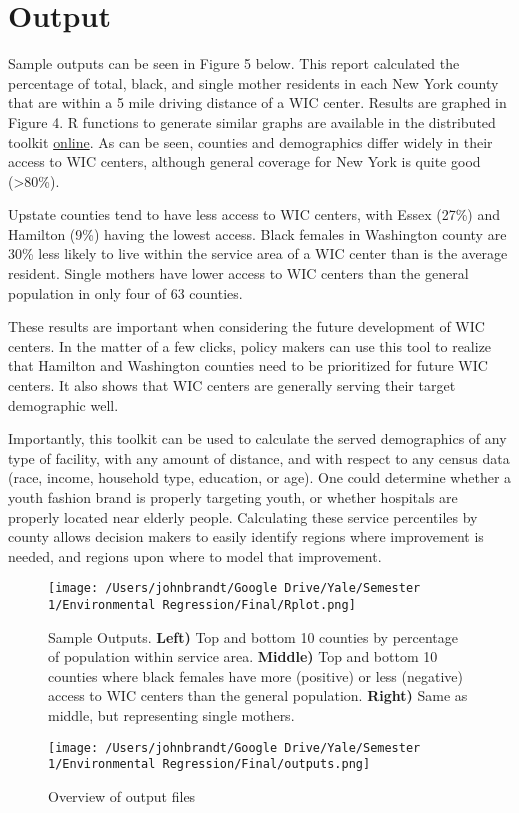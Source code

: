 \documentclass[11pt,]{article}
\begin{document}
\section{Output}\label{output}

\noindent Sample outputs can be seen in Figure 5 below. This report
calculated the percentage of total, black, and single mother residents
in each New York county that are within a 5 mile driving distance of a
WIC center. Results are graphed in Figure 4. R functions to generate
similar graphs are available in the distributed toolkit
\href{https://www.github.com/johnmbrandt/public-resource-mapper/}{online}.
As can be seen, counties and demographics differ widely in their access
to WIC centers, although general coverage for New York is quite good
(\textgreater{}80\%).\vspace{3mm}

\noindent Upstate counties tend to have less access to WIC centers, with
Essex (27\%) and Hamilton (9\%) having the lowest access. Black females
in Washington county are 30\% less likely to live within the service
area of a WIC center than is the average resident. Single mothers have
lower access to WIC centers than the general population in only four of
63 counties. \vspace{3mm}

\noindent These results are important when considering the future
development of WIC centers. In the matter of a few clicks, policy makers
can use this tool to realize that Hamilton and Washington counties need
to be prioritized for future WIC centers. It also shows that WIC centers
are generally serving their target demographic well.\vspace{3mm}

\noindent Importantly, this toolkit can be used to calculate the served
demographics of any type of facility, with any amount of distance, and
with respect to any census data (race, income, household type,
education, or age). One could determine whether a youth fashion brand is
properly targeting youth, or whether hospitals are properly located near
elderly people. Calculating these service percentiles by county allows
decision makers to easily identify regions where improvement is needed,
and regions upon where to model that improvement.\vspace{3mm}

\begin{figure}[htbp]
\centering
\texttt{[image: /Users/johnbrandt/Google Drive/Yale/Semester 1/Environmental Regression/Final/Rplot.png]}
\caption{Sample Outputs. \textbf{Left)} Top and bottom 10 counties by
percentage of population within service area. \textbf{Middle)} Top and
bottom 10 counties where black females have more (positive) or less
(negative) access to WIC centers than the general population.
\textbf{Right)} Same as middle, but representing single mothers.}
\end{figure}

\begin{figure}[htbp]
\centering
\texttt{[image: /Users/johnbrandt/Google Drive/Yale/Semester 1/Environmental Regression/Final/outputs.png]}
\caption{Overview of output files}
\end{figure}




\newpage
\singlespacing 

\end{document}
